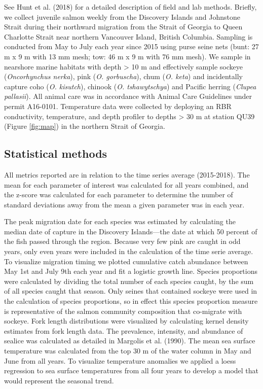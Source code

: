 \documentclass[fleqn,10pt]{wlpeerj} %
\begin{document}
See Hunt et al. (2018) for a detailed description of field and lab
methods. Briefly, we collect juvenile salmon weekly from the Discovery
Islands and Johnstone Strait during their northward migration from the
Strait of Georgia to Queen Charlotte Strait near northern Vancouver
Island, British Columbia. Sampling is conducted from May to July each
year since 2015 using purse seine nets (bunt: 27 m x 9 m with 13 mm
mesh; tow: 46 m x 9 m with 76 mm mesh). We sample in nearshore marine
habitats with depth \textgreater{} 10 m and effectively sample sockeye
(\emph{Oncorhynchus nerka}), pink (\emph{O. gorbuscha}), chum (\emph{O.
keta}) and incidentally capture coho (\emph{O. kisutch}), chinook
(\emph{O. tshawytschya}) and Pacific herring (\emph{Clupea pallasii}).
All animal care was in accordance with Animal Care Guidelines under
permit A16-0101. Temperature data were collected by deploying an RBR
conductivity, temperature, and depth profiler to depths \textgreater{}
30 m at station QU39 (Figure \ref{fig:map}) in the northern Strait of
Georgia.

\subsection*{Statistical methods}\label{statistical-methods}

All metrics reported are in relation to the time series average
(2015-2018). The mean for each parameter of interest was calculated for
all years combined, and the z-score was calculated for each parameter to
determine the number of standard deviations away from the mean a given
parameter was in each year.

The peak migration date for each species was estimated by calculating
the median date of capture in the Discovery Islands---the date at which
50 percent of the fish passed through the region. Because very few pink
are caught in odd years, only even years were included in the
calculation of the time serie average. To visualize migration timing we
plotted cumulative catch abundance between May 1st and July 9th each
year and fit a logistic growth line. Species proportions were calculated
by dividing the total number of each species caught, by the sum of all
species caught that season. Only seines that contained sockeye were used
in the calculation of species proportions, so in effect this species
proportion measure is representative of the salmon community composition
that co-migrate with sockeye. Fork length distributions were visualized
by calculating kernel density estimates from fork length data. The
prevalence, intensity, and abundance of sealice was calculated as
detailed in Margolis et al. (1990). The mean sea surface temperature was
calculated from the top 30 m of the water column in May and June from
all years. To visualize temperature anomalies we applied a loess
regression to sea surface temperatures from all four years to develop a
model that would represent the seasonal trend.
\end{document}
